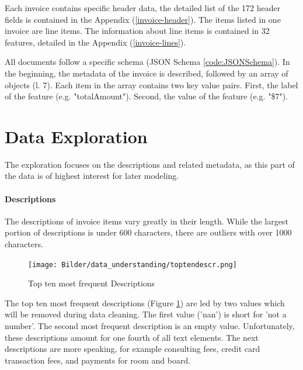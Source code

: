 Each invoice contains specific header data, the detailed list of the 172 header fields is contained in the Appendix (\ref{invoice-header}). 
The items listed in one invoice are line items. The information about line items is contained in 32 features, detailed in the Appendix (\ref{invoice-lines}).

All documents follow a specific schema (\ac{JSON} Schema \ref{code:JSONSchema}). In the beginning, the metadata of the invoice is described, followed by an array of objects (l. 7). Each item in the array contains two key value pairs. First, the label of the feature (e.g. "totalAmount"). Second, the value of the feature (e.g. "\$7").






\section{Data Exploration}
The exploration focuses on the descriptions and related metadata, as this part of the data is of highest interest for later modeling.
\paragraph{Descriptions}
The descriptions of invoice items vary greatly in their length. While the largest portion of descriptions is under 600 characters, there are outliers with over 1000 characters. 

\begin{figure}[!h]
	\centering
	\texttt{[image: Bilder/data\_understanding/toptendescr.png]}
	\caption{Top ten most frequent Descriptions}
	\label{fig:descr-most-frequent}
\end{figure}
The top ten most frequent descriptions (Figure \ref{fig:descr-most-frequent}) are led by two values which will be removed during data cleaning. The first value ('nan') is short for 'not a number'. The second most frequent description is an empty value. Unfortunately, these descriptions amount for one fourth of all text elements. The next descriptions are more speaking, for example consulting fees, credit card transaction fees, and payments for room and board.

